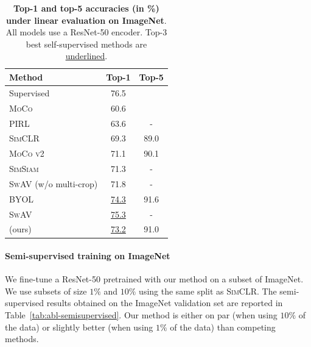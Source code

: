 \begin{table}[ht]
\caption{\textbf{Top-1 and top-5 accuracies (in \%) under linear evaluation on ImageNet}. All models use a ResNet-50 encoder. Top-3 best self-supervised methods are \underline{underlined}.} %
\label{tab:abl-imagenet}
\vskip 0.15in
\begin{center}
\begin{tabular}{lcc}
\toprule
Method  &  Top-1 & Top-5 \\
\midrule
Supervised & 76.5 & \\
\midrule
\textsc{MoCo}    & 60.6 & \\
\textsc{PIRL} & 63.6 & - \\
\textsc{SimCLR} & 69.3  & 89.0 \\
\textsc{MoCo v2} & 71.1 & 90.1 \\
\textsc{SimSiam} & 71.3 & - \\
\textsc{SwAV} (w/o multi-crop) & 71.8 & - \\
\textsc{BYOL} & \underline{74.3} & 91.6  \\
\textsc{SwAV} & \underline{75.3} & - \\
\AlgoName{} (ours) & \underline{73.2} & 91.0 \\
\bottomrule
\end{tabular}
\end{center}
\vskip -0.1in
\end{table}

\paragraph{Semi-supervised training on ImageNet}
We fine-tune a ResNet-50 pretrained with our method on a subset of ImageNet. We use subsets of size $1\%$ and $10\%$ using the same split as \textsc{SimCLR}. The semi-supervised results obtained on the ImageNet validation set are reported in Table~\ref{tab:abl-semisupervised}. Our method is either on par (when using $10\%$ of the data) or slightly better (when using $1\%$ of the data) than competing methods.

